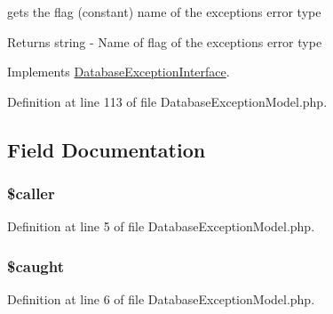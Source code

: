 gets the flag (constant) name of the exception\textquotesingle{}s error type

\begin{DoxyReturn}{Returns}
string -\/ Name of flag of the exception\textquotesingle{}s error type 
\end{DoxyReturn}


Implements \hyperlink{interface_database_exception_interface_aaf4fb3a4978596f9e37fdbdd1e786082}{Database\+Exception\+Interface}.



Definition at line 113 of file Database\+Exception\+Model.\+php.



\subsection{Field Documentation}
\hypertarget{class_database_exception_model_a0b21046130eb880a92ca750675597c75}{}
\subsubsection[{\$caller}]{\setlength{\rightskip}{0pt plus 5cm}\$caller\hspace{0.3cm}{\ttfamily [protected]}}\label{class_database_exception_model_a0b21046130eb880a92ca750675597c75}


Definition at line 5 of file Database\+Exception\+Model.\+php.

\hypertarget{class_database_exception_model_a461278c71fc5038037fac5e2f5e1c6af}{}
\subsubsection[{\$caught}]{\setlength{\rightskip}{0pt plus 5cm}\$caught\hspace{0.3cm}{\ttfamily [protected]}}\label{class_database_exception_model_a461278c71fc5038037fac5e2f5e1c6af}


Definition at line 6 of file Database\+Exception\+Model.\+php.

\hypertarget{class_database_exception_model_a078837d5b35b669c158aa3cc2c0e2a9f}{}
